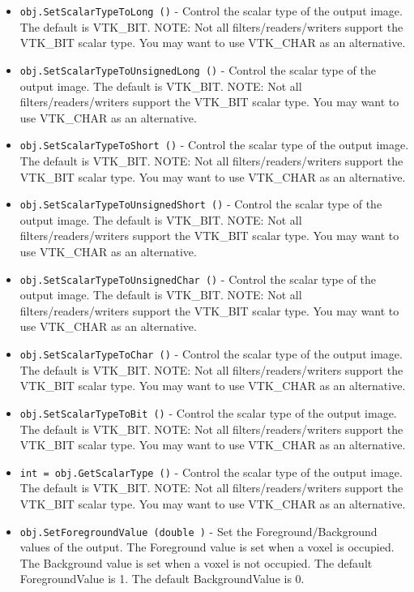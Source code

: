 \begin{itemize}
\item  \verb|obj.SetScalarTypeToLong ()| -  Control the scalar type of the output image. The default is
 VTK\_BIT.
 NOTE: Not all filters/readers/writers support the VTK\_BIT
 scalar type. You may want to use VTK\_CHAR as an alternative.

\item  \verb|obj.SetScalarTypeToUnsignedLong ()| -  Control the scalar type of the output image. The default is
 VTK\_BIT.
 NOTE: Not all filters/readers/writers support the VTK\_BIT
 scalar type. You may want to use VTK\_CHAR as an alternative.

\item  \verb|obj.SetScalarTypeToShort ()| -  Control the scalar type of the output image. The default is
 VTK\_BIT.
 NOTE: Not all filters/readers/writers support the VTK\_BIT
 scalar type. You may want to use VTK\_CHAR as an alternative.

\item  \verb|obj.SetScalarTypeToUnsignedShort ()| -  Control the scalar type of the output image. The default is
 VTK\_BIT.
 NOTE: Not all filters/readers/writers support the VTK\_BIT
 scalar type. You may want to use VTK\_CHAR as an alternative.

\item  \verb|obj.SetScalarTypeToUnsignedChar ()| -  Control the scalar type of the output image. The default is
 VTK\_BIT.
 NOTE: Not all filters/readers/writers support the VTK\_BIT
 scalar type. You may want to use VTK\_CHAR as an alternative.

\item  \verb|obj.SetScalarTypeToChar ()| -  Control the scalar type of the output image. The default is
 VTK\_BIT.
 NOTE: Not all filters/readers/writers support the VTK\_BIT
 scalar type. You may want to use VTK\_CHAR as an alternative.

\item  \verb|obj.SetScalarTypeToBit ()| -  Control the scalar type of the output image. The default is
 VTK\_BIT.
 NOTE: Not all filters/readers/writers support the VTK\_BIT
 scalar type. You may want to use VTK\_CHAR as an alternative.

\item  \verb|int = obj.GetScalarType ()| -  Control the scalar type of the output image. The default is
 VTK\_BIT.
 NOTE: Not all filters/readers/writers support the VTK\_BIT
 scalar type. You may want to use VTK\_CHAR as an alternative.

\item  \verb|obj.SetForegroundValue (double )| -  Set the Foreground/Background values of the output. The
 Foreground value is set when a voxel is occupied. The Background
 value is set when a voxel is not occupied.
 The default ForegroundValue is 1. The default BackgroundValue is
 0.


\end{itemize}
